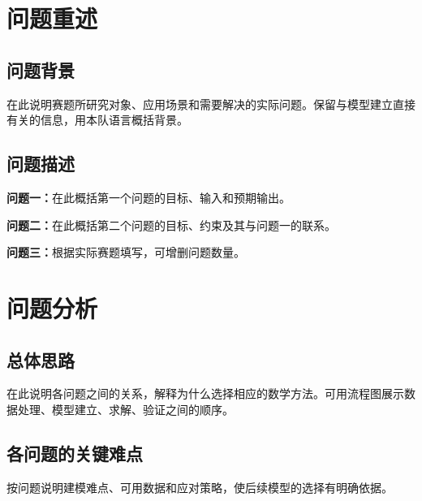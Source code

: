 \section{问题重述}
\subsection{问题背景}
在此说明赛题所研究对象、应用场景和需要解决的实际问题。保留与模型建立直接有关的信息，用本队语言概括背景。

\subsection{问题描述}
\textbf{问题一：}在此概括第一个问题的目标、输入和预期输出。

\textbf{问题二：}在此概括第二个问题的目标、约束及其与问题一的联系。

\textbf{问题三：}根据实际赛题填写，可增删问题数量。

\section{问题分析}
\subsection{总体思路}
在此说明各问题之间的关系，解释为什么选择相应的数学方法。可用流程图展示数据处理、模型建立、求解、验证之间的顺序。

\subsection{各问题的关键难点}
按问题说明建模难点、可用数据和应对策略，使后续模型的选择有明确依据。
